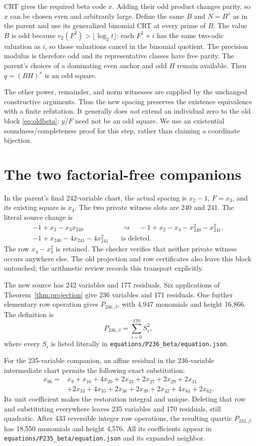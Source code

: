 \documentclass[10pt,letterpaper]{article}
\theoremstyle{definition}\newtheorem{remark}[theorem]{Remark}
\newcommand{\BP}{P_{\mathrm{235},\beta}}
\newcommand{\SP}{P_{\mathrm{236},\beta}}
\begin{document}
CRT gives the required beta code $x$. Adding their odd product changes
parity, so $x$ can be chosen even and arbitrarily large. Define the same
$B$ and $N=B^x$ as in the parent and use its generalized binomial CRT at
every prime of $B$. The value $B$ is odd because
$v_2(F^2)>\lfloor\log_2t\rfloor$: each $F^2+i$ has the same two-adic
valuation as $i$, so those valuations cancel in the binomial quotient.
The precision modulus is therefore odd and its representative classes
have free parity. The parent's choices of a dominating even anchor and
odd $H$ remain available. Then $q=(BH)^x$ is an odd square.

The other power, remainder, and norm witnesses are supplied by the
unchanged constructive arguments. Thus the new spacing preserves the
existence equivalence with a finite refutation. It generally does
\emph{not} extend an individual zero to the old block
\eqref{eq:oldbeta}: $y/F$ need not be an odd square. We use an existential
soundness/completeness proof for this step, rather than claiming a
coordinate bijection.

\section{The two factorial-free companions}

In the parent's final 242-variable chart, the actual spacing is $x_2-1$,
$F=x_3$, and its existing square is $x_4$. The two private witness slots
are 240 and 241. The literal source change is
\begin{align*}
 -1+x_2-x_3x_{240}&\quad\rightsquigarrow\quad
 -1+x_2-x_4-x_{240}^2-x_{241}^2,\\
 -1+x_{240}-4x_{241}-4x_{241}^2&\quad\text{is deleted}.
\end{align*}
The row $x_4-x_3^2$ is retained. The checker verifies that neither private
witness occurs anywhere else. The old projection and row certificates
also leave this block untouched; the arithmetic review records this
transport explicitly.

The new source has 242 variables and 177 residuals. Six applications of
Theorem~\ref{thm:projection} give 236 variables and 171 residuals. One
further elementary row operation gives $\SP$, with 4,947 monomials and
height 16,866. The definition is
\[
 \SP=\sum_{i=0}^{170}S_i^2,
\]
where every $S_i$ is listed literally in
\nolinkurl{equations/P236_beta/equation.json}.

For the 235-variable companion, an affine residual in the 236-variable
intermediate chart permits the following exact substitution:
\begin{align*}
 x_{96}={}&x_9+x_{10}+4x_{20}+2x_{23}+2x_{27}+2x_{29}+2x_{31}\\
 &+2x_{33}+4x_{35}+2x_{36}+2x_{39}+2x_{42}+4x_{61}+2x_{62}.
\end{align*}
Its unit coefficient makes the restoration integral and unique.
Deleting that row and substituting everywhere leaves 235 variables and
170 residuals, still quadratic. After 433 reversible integer row
operations, the resulting quartic $\BP$ has 18,550 monomials and height
4,576. All its coefficients appear in
\nolinkurl{equations/P235_beta/equation.json} and its expanded neighbor.
\end{document}
